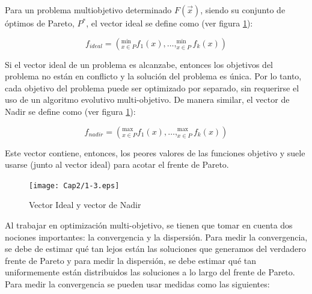       \begin{definicion}
      Para un problema multiobjetivo determinado $F\left(\vec{x}\right)$, siendo su conjunto de \'optimos de Pareto, $P^*$, 
      el vector ideal se define como (ver figura \ref{fig:ideanadir}):
      
      \[  f_{ideal}= \left(^{\min}_{x\in P}f_1\left(x\right), \ldots, ^{\min}_{x\in P}f_k\left(x\right) \right)\]
      
      Si el vector ideal de un problema es alcanzabe, entonces los objetivos del problema no est\'an en conflicto 
      y la soluci\'on del problema es \'unica. Por lo tanto, cada objetivo del problema puede ser optimizado por separado,
      sin requerirse el uso de un algoritmo evolutivo multi-objetivo.
      De manera similar, el vector de Nadir se define como (ver figura \ref{fig:ideanadir}):
      
      \[  f_{nadir}= \left(^{\max}_{x\in P}f_1\left(x\right), \ldots, ^{\max}_{x\in P}f_k\left(x\right) \right)\]
      
      Este vector contiene, entonces, los peores valores de las funciones objetivo y suele usarse (junto al vector ideal)
      para acotar el frente de Pareto.      
      
      \end{definicion}
      
      \begin{figure}
	\centering
	\texttt{[image: Cap2/1-3.eps]}
	  \caption{Vector Ideal y vector de Nadir}
      \label{fig:ideanadir}
      \end{figure}
      
      Al trabajar en optimizaci\'on multi-objetivo, se tienen que tomar en cuenta dos nociones importantes: la convergencia y la 
      dispersi\'on. Para medir la convergencia, se debe de estimar qu\'e tan lejos est\'an las soluciones que generamos del
      verdadero frente de Pareto y para medir la dispersi\'on, se debe estimar qu\'e tan uniformemente est\'an distribuidos 
      las soluciones a lo largo del frente de Pareto. Para medir la convergencia se pueden usar medidas como las siguientes:
      
